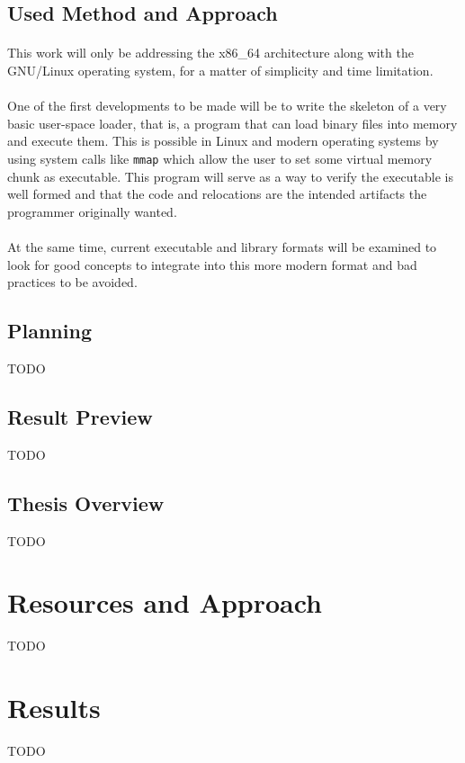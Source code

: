 \documentclass[12pt]{article}
\begin{document}
	\subsection{Used Method and Approach}
	\paragraph{}This work will only be addressing the x86\_64 architecture along with the GNU/Linux operating system, for a matter of simplicity and time limitation.
    
    \paragraph{}One of the first developments to be made will be to write the skeleton of a very basic user-space loader, that is, a program that can load binary files into memory and execute them. This is possible in Linux and modern operating systems by using system calls like \verb|mmap| which allow the user to set some virtual memory chunk as executable. This program will serve as a way to verify the executable is well formed and that the code and relocations are the intended artifacts the programmer originally wanted.
    
    \paragraph{}At the same time, current executable and library formats will be examined to look for good concepts to integrate into this more modern format and bad practices to be avoided.
	\subsection{Planning}
	TODO
	\subsection{Result Preview}
	TODO
	\subsection{Thesis Overview}
	TODO	
	\section{Resources and Approach}
	TODO
	\section{Results}
	TODO
\end{document}
